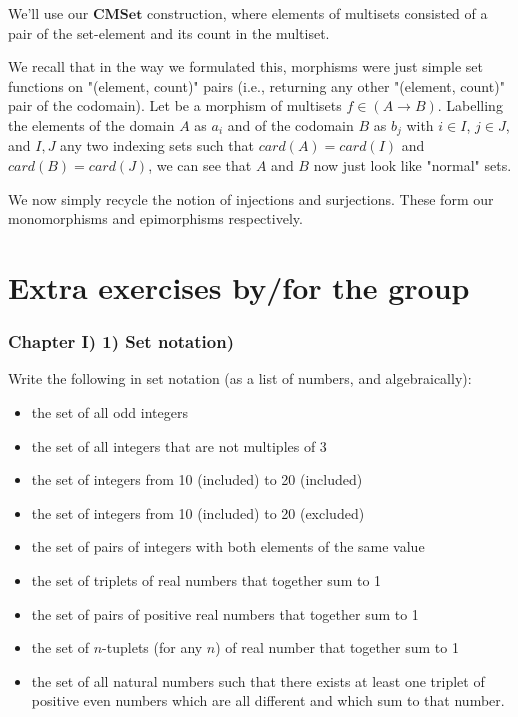 \documentclass[12pt, letterpaper, twoside]{report}
\begin{document}
We'll use our $\mathbf{CMSet}$ construction, where elements of multisets consisted of a pair of the set-element and its count in the multiset. 

We recall that in the way we formulated this, morphisms were just simple set functions on "(element, count)" pairs (i.e., returning any other "(element, count)" pair of the codomain). Let be a morphism of multisets $f \in (A \to B)$. Labelling the elements of the domain $A$ as $a_i$ and of the codomain $B$ as $b_j$ with $i \in I$, $j \in J$, and $I, J$ any two indexing sets such that $card(A) = card(I)$ and $card(B) = card(J)$, we can see that $A$ and $B$ now just look like "normal" sets.

We now simply recycle the notion of injections and surjections. These form our monomorphisms and epimorphisms respectively.


\newpage
\part{Extra exercises by/for the group}

\section*{Chapter I) 1) Set notation)}

Write the following in set notation (as a list of numbers, and algebraically):
\begin{itemize}
	\item the set of all odd integers
	\item the set of all integers that are not multiples of 3
	\item the set of integers from 10 (included) to 20 (included)
	\item the set of integers from 10 (included) to 20 (excluded)
	\item the set of pairs of integers with both elements of the same value
	\item the set of triplets of real numbers that together sum to 1
	\item the set of pairs of positive real numbers that together sum to 1
	\item the set of $n$-tuplets (for any $n$) of real number that together sum to 1
	\item the set of all natural numbers such that there exists at least one triplet of positive even numbers which are all different and which sum to that number.
\end{itemize}
\end{document}
